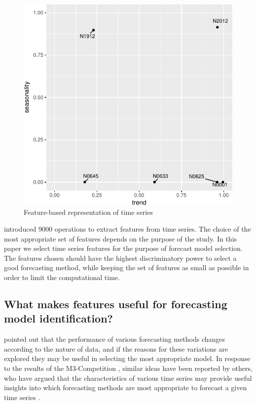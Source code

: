 \documentclass[11pt,a4paper,]{article}
\theoremstyle{definition}
\theoremstyle{definition}
\theoremstyle{definition}
\theoremstyle{remark}
\begin{document}
\begin{figure}

{\centering \includegraphics[width=0.7\linewidth]{figure/fig2-1} 

}

\caption{Feature-based representation of time series}\label{fig:fig2}
\end{figure}

\textcite{fulcher2014highly} introduced 9000 operations to extract
features from time series. The choice of the most appropriate set of
features depends on the purpose of the study. In this paper we select
time series features for the purpose of forecast model selection. The
features chosen should have the highest discriminatory power to select a
good forecasting method, while keeping the set of features as small as
possible in order to limit the computational time.

\subsection{What makes features useful for forecasting model
identification?}\label{what-makes-features-useful-for-forecasting-model-identification}

\textcite{reid1972comparison} pointed out that the performance of
various forecasting methods changes according to the nature of data, and
if the reasons for these variations are explored they may be useful in
selecting the most appropriate model. In response to the results of the
M3-Competition \autocite{makridakis2000m3}, similar ideas have been
reported by others, who have argued that the characteristics of various
time series may provide useful insights into which forecasting methods
are most appropriate to forecast a given time series
\autocites{hyndman2001s}{lawrence2001s}{armstrong2001s}.
\end{document}
